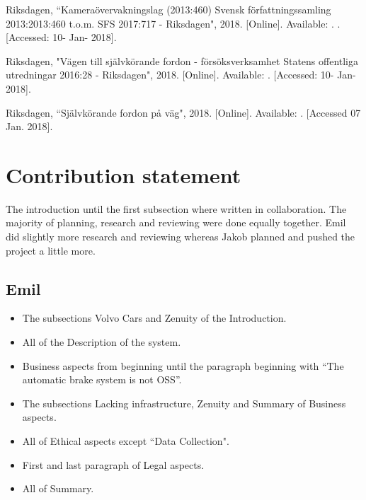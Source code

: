 \documentclass[conference]{IEEEtran}
\begin{document}
\begin{thebibliography}{00}
	Riksdagen, 
	``Kamera\"overvakningslag (2013:460) Svensk f\"orfattningssamling 2013:2013:460 t.o.m. SFS 2017:717 - Riksdagen", 
	2018. 
	[Online]. Available: . 
	.
	[Accessed: 10- Jan- 2018].
	
	Riksdagen,
	"V\"agen till sj\"alvk\"orande fordon - f\"ors\"oksverksamhet Statens offentliga utredningar 2016:28 - Riksdagen",
	2018. 
	[Online]. Available: 
	. 
	[Accessed: 10- Jan- 2018].
	
	Riksdagen,
	``Sj\"alvk\"orande fordon p\r{a} v\"ag",
	2018.
	[Online]. Available:
	.
	[Accessed 07 Jan. 2018].
\end{thebibliography}

\newpage
\appendix
\section*{Contribution statement}
The introduction until the first subsection where written in collaboration. The majority of planning, research and reviewing were done equally together. Emil did slightly more research and reviewing whereas Jakob planned and pushed the project a little more.
\subsection{Emil}
\begin{itemize}
	\item
	The subsections Volvo Cars and Zenuity of  the Introduction.
	\item
	All of the Description of the system.
	\item
	Business aspects from beginning until the paragraph beginning with ``The automatic brake system is not OSS''.
	\item
	The subsections Lacking infrastructure, Zenuity and Summary of Business aspects.
	\item
	All of Ethical aspects except ``Data Collection".
	\item
	First and last paragraph of Legal aspects.
	\item
	All of Summary.
\end{itemize}
\end{document}
